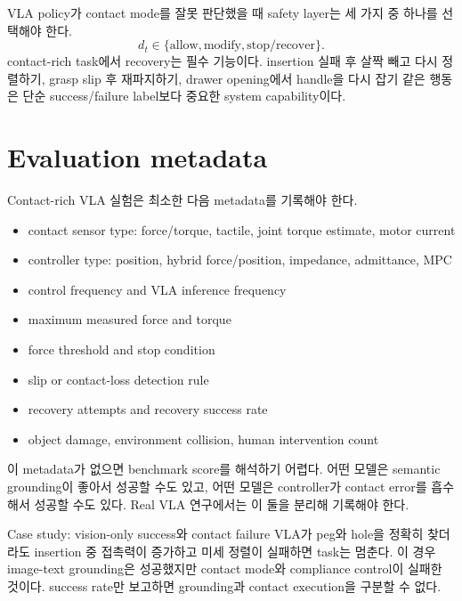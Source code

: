 VLA policy가 contact mode를 잘못 판단했을 때 safety layer는 세 가지 중 하나를 선택해야 한다.
\begin{equation}
  d_t \in \{\text{allow},\text{modify},\text{stop/recover}\}.
  \label{eq:contact-safety-decision}
\end{equation}
contact-rich task에서 recovery는 필수 기능이다. insertion 실패 후 살짝 빼고 다시 정렬하기, grasp slip 후 재파지하기, drawer opening에서 handle을 다시 잡기 같은 행동은 단순 success/failure label보다 중요한 system capability이다.

\section{Evaluation metadata}

Contact-rich VLA 실험은 최소한 다음 metadata를 기록해야 한다.

\begin{itemize}
  \item contact sensor type: force/torque, tactile, joint torque estimate, motor current
  \item controller type: position, hybrid force/position, impedance, admittance, MPC
  \item control frequency and VLA inference frequency
  \item maximum measured force and torque
  \item force threshold and stop condition
  \item slip or contact-loss detection rule
  \item recovery attempts and recovery success rate
  \item object damage, environment collision, human intervention count
\end{itemize}

이 metadata가 없으면 benchmark score를 해석하기 어렵다. 어떤 모델은 semantic grounding이 좋아서 성공할 수도 있고, 어떤 모델은 controller가 contact error를 흡수해서 성공할 수도 있다. Real VLA 연구에서는 이 둘을 분리해 기록해야 한다.

\begin{casebox}{Case study: vision-only success와 contact failure}
VLA가 peg와 hole을 정확히 찾더라도 insertion 중 접촉력이 증가하고 미세 정렬이 실패하면 task는 멈춘다. 이 경우 image-text grounding은 성공했지만 contact mode와 compliance control이 실패한 것이다. success rate만 보고하면 grounding과 contact execution을 구분할 수 없다.
\end{casebox}

